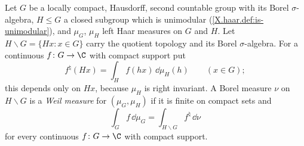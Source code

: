 Let $G$ be a locally compact, Hausdorff, second countable group with its Borel $\sigma$-algebra, $H\le G$ a closed
subgroup which is unimodular (\cref{X.haar.def:is-unimodular}), and $\mu_G$, $\mu_H$ left Haar measures on $G$ and $H$. Let
$H\backslash G=\{Hx:x\in G\}$ carry the quotient topology and its Borel $\sigma$-algebra. For a continuous $f\colon G\to\C$ with
compact support put
\[
  f^\natural(Hx)=\int_Hf(hx)\,\dd\mu_H(h)\qquad(x\in G);
\]
this depends only on $Hx$, because $\mu_H$ is right invariant. A Borel measure $\nu$ on $H\backslash G$ is a \emph{Weil measure} for
$(\mu_G,\mu_H)$ if it is finite on compact sets and
\[
  \int_Gf\,\dd\mu_G=\int_{H\backslash G}f^\natural\,\dd\nu
\]
for every continuous $f\colon G\to\C$ with compact support.

